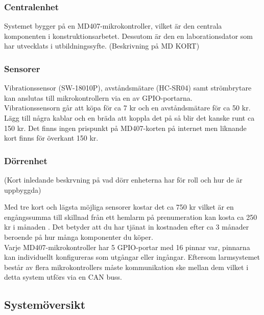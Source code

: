 \documentclass{article}
\begin{document}
\subsubsection{Centralenhet}
Systemet bygger på en MD407-mikrokontroller, vilket är den centrala komponenten i konstruktionsarbetet. 
Dessutom är den en laborationsdator som har utvecklats i utbildningssyfte. (Beskrivning på MD KORT)

\subsubsection{Sensorer}
Vibrationssensor (SW-18010P), avståndsmätare (HC-SR04) samt strömbrytare kan anslutas till mikrokontrollern via en av GPIO-portarna.\\
Vibrationssensorn går att köpa för ca 7 kr och en avståndsmätare för ca 50 kr.
Lägg till några kablar och en bräda att koppla det på så blir det kanske runt ca 150 kr. 
Det finns ingen prispunkt på MD407-korten på internet men liknande kort finns för överkant 150 kr.

\subsubsection{Dörrenhet}
(Kort inledande beskrvning på vad dörr enheterna har för roll och hur de är uppbyggda)

Med tre kort och lägsta möjliga sensorer kostar det ca 750 kr vilket är en engångssumma till skillnad från ett hemlarm på prenumeration kan kosta ca 250 kr i månaden \cite{Offerta}.
Det betyder att du har tjänat in kostnaden efter ca 3 månader beroende på hur många komponenter du köper.\\

Varje MD407-mikrokontroller har 5 GPIO-portar med 16 pinnar var, pinnarna kan individuellt konfigureras som utgångar eller ingångar.
Eftersom larmsystemet består av flera mikrokontrollers måste kommunikation ske mellan dem vilket i detta system utförs via en CAN buss.

\subsection{Systemöversikt}
\end{document}
